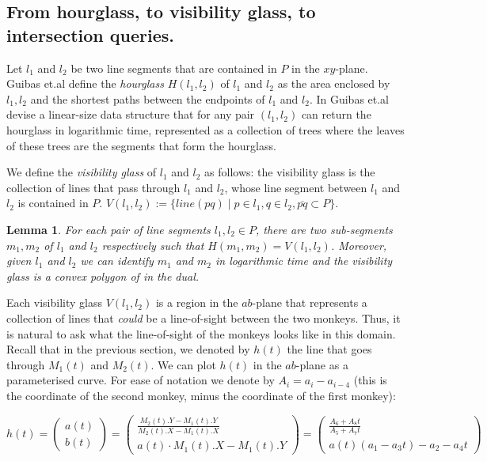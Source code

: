 \documentclass{article}
\newtheorem{lemma}{Lemma}
\newcommand{\etal}{et.al\xspace}
\begin{document}
\subsection{From hourglass, to visibility glass, to intersection queries.}
\label{sec:nonghost}

Let $l_1$ and $l_2$ be two line segments that are contained in $P$ in the $xy$-plane. Guibas \etal define the \emph{hourglass} $H(l_1, l_2)$ of $l_1$ and $l_2$ as the area enclosed by $l_1, l_2$ and the shortest paths between the endpoints of $l_1$ and $l_2$. In \cite{GUIBAS1989126} Guibas \etal devise a linear-size data structure that for any pair $(l_1, l_2)$ can return the hourglass in logarithmic time, represented as a collection of trees where the leaves of these trees are the segments that form the hourglass.


We define the \emph{visibility glass} of $l_1$ and $l_2$ as follows: the visibility glass is the collection of lines that pass through $l_1$ and $l_2$, whose line segment between $l_1$ and $l_2$ is contained in $P$. $V(l_1, l_2) := \{ line(pq) \mid p \in l_1, q \in l_2,  \overline{pq} \subset P \}$. \\

\begin{lemma}
  For each pair of line segments $l_1, l_2 \in P$, there are two sub-segments $m_1, m_2$ of $l_1$ and $l_2$ respectively such that $H(m_1, m_2) = V(l_1, l_2)$. Moreover, given $l_1$ and $l_2$ we can identify $m_1$ and $m_2$ in logarithmic time and the visibility glass is a convex polygon of in the dual.
\end{lemma}

Each visibility glass $V(l_1, l_2)$ is a region in the $ab$-plane that represents a collection of lines that \emph{could} be a line-of-sight between the two monkeys. Thus, it is natural to ask what the line-of-sight of the monkeys looks like in this domain. Recall that in the previous section, we denoted by $h(t)$ the line that goes through $M_1(t)$ and $M_2(t)$. We can plot $h(t)$ in the $ab$-plane as a parameterised curve. For ease of notation we denote by $A_i = a_i - a_{i-4}$ (this is the coordinate of the second monkey, minus the coordinate of the first monkey):


  \begin{equation*}
   h(t) = \left( \begin{array}{c}
         a(t)  \\
         b(t) 
    \end{array}  \right) = 
    \left( \begin{array}{c}
         \frac{M_2(t).Y - M_1(t).Y}{M_2(t).X - M_1(t).X}  \\
         a(t)\cdot M_1(t).X - M_1(t).Y 
    \end{array}  \right) =
    \left( \begin{array}{c}
         \frac{ A_6 + A_8 t}
      { A_5  + A_7 t }  \\
         a(t)(a_1 - a_3 t) - a_2 - a_4 t 
    \end{array}  \right)
  \end{equation*}
\end{document}
